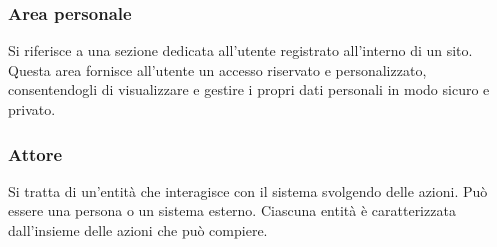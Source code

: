 \subsubsection*{Area personale}
Si riferisce a una sezione dedicata all'utente registrato all'interno di un sito. 
Questa area fornisce all'utente un accesso riservato e personalizzato, consentendogli di visualizzare e gestire i propri dati personali in modo sicuro e privato. 

\subsubsection*{Attore}
Si tratta di un'entità che interagisce con il sistema svolgendo delle azioni.
Può essere una persona o un sistema esterno. Ciascuna entità è caratterizzata
dall'insieme delle azioni che può compiere.

\newpage
